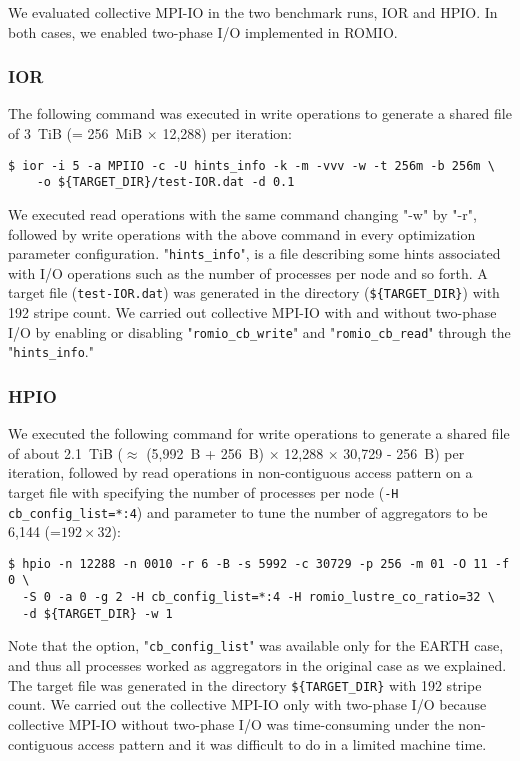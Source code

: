 \documentclass{jhps}
\begin{document}
We evaluated collective MPI-IO in the two benchmark runs, IOR and HPIO.
In both cases, we enabled two-phase I/O implemented in ROMIO.

\subsubsection{IOR}

The following command was executed in write operations to generate
a shared file of 3~TiB (= 256~MiB $\times$ 12,288) per iteration:
%
\begin{verbatim}
$ ior -i 5 -a MPIIO -c -U hints_info -k -m -vvv -w -t 256m -b 256m \
    -o ${TARGET_DIR}/test-IOR.dat -d 0.1
\end{verbatim}
%
We executed read operations with the same command changing "-w" by "-r",
followed by write operations with the above command
in every optimization parameter configuration.
"{\tt hints\_info}", is a file describing some hints associated with
I/O operations such as the number of processes per node and so forth.
%
%
A target file ({\tt test-IOR.dat}) was generated in the directory
({\tt \$\{TARGET\_DIR\}}) with 192 stripe count.
We carried out collective MPI-IO with and without two-phase I/O by enabling
or disabling "{\tt romio\_cb\_write}" and "{\tt romio\_cb\_read}"
through the "{\tt hints\_info}."
%

\subsubsection{HPIO}

We executed the following command for write operations to generate
a shared file of about 2.1~TiB ($\approx$ (5,992~B + 256~B) $\times$ 12,288 $\times$ 30,729 - 256~B)
per iteration, followed by read operations in non-contiguous access pattern
on a target file with specifying the number of processes per node ({\tt -H cb\_config\_list=*:4}) and parameter to tune the number of aggregators to be
6,144 (=$192 \times 32$):
%
\begin{verbatim}
$ hpio -n 12288 -n 0010 -r 6 -B -s 5992 -c 30729 -p 256 -m 01 -O 11 -f 0 \
  -S 0 -a 0 -g 2 -H cb_config_list=*:4 -H romio_lustre_co_ratio=32 \
  -d ${TARGET_DIR} -w 1
\end{verbatim}
%
Note that the option, "{\tt cb\_config\_list}" was available only for
the EARTH case, and thus all processes worked as aggregators
in the original case as we explained.
The target file was generated in the directory {\tt \$\{TARGET\_DIR\}}
with 192 stripe count. We carried out the collective MPI-IO
only with two-phase I/O because collective MPI-IO without two-phase I/O was
time-consuming under the non-contiguous access pattern and
it was difficult to do in a limited machine time.
\end{document}
